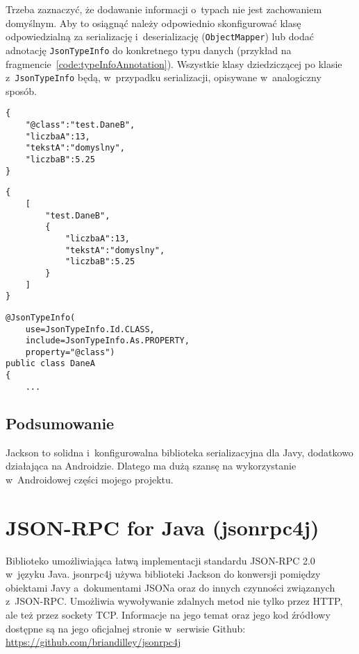 \begin{description}
Trzeba zaznaczyć, że dodawanie informacji o~typach nie jest zachowaniem domyślnym. Aby to osiągnąć należy odpowiednio skonfigurować klasę odpowiedzialną za serializację i~deserializację (\texttt{ObjectMapper}) lub dodać adnotację \texttt{JsonTypeInfo} do konkretnego typu danych (przykład na fragmencie~\ref{code:typeInfoAnnotation}). Wszystkie klasy dziedziczącej po klasie z~\texttt{JsonTypeInfo} będą, w~przypadku serializacji, opisywane w~analogiczny sposób.

\begin{lstlisting}[float, frame=single, caption={Oznaczanie typu przez dodatkowe pole.}, label=code:typeInfoField]
{
    "@class":"test.DaneB",
    "liczbaA":13,
    "tekstA":"domyslny",
    "liczbaB":5.25
}
\end{lstlisting}

\begin{lstlisting}[float, frame=single, caption={Oznaczanie typu przez owinięcie w~tablicę i~dodanie do niej elementu.}, label=code:typeInfoArray]
{
    [
        "test.DaneB",
        {
            "liczbaA":13,
            "tekstA":"domyslny",
            "liczbaB":5.25
        }
    ]
}
\end{lstlisting}

\begin{lstlisting}[float, frame=single, caption={Parametryzacja przekazywania informacji o~typie w~definicji klasy.}, label=code:typeInfoAnnotation]
@JsonTypeInfo(
    use=JsonTypeInfo.Id.CLASS,
    include=JsonTypeInfo.As.PROPERTY,
    property="@class")
public class DaneA
{
    ...
\end{lstlisting}
\end{description}

\subsection{Podsumowanie}
Jackson to solidna i~konfigurowalna biblioteka serializacyjna dla Javy, dodatkowo działająca na Androidzie.
Dlatego ma dużą szansę na wykorzystanie w~Androidowej części mojego projektu.



\section{JSON-RPC for Java (jsonrpc4j)}
Biblioteko umożliwiająca łatwą implementacji standardu JSON-RPC 2.0 w~języku Java.
jsonrpc4j używa biblioteki Jackson do konwersji pomiędzy obiektami Javy a~dokumentami JSONa oraz do innych czynności związanych z~JSON-RPC.
Umożliwia wywoływanie zdalnych metod nie tylko przez HTTP, ale też przez sockety TCP.
Informacje na jego temat oraz jego kod źródłowy dostępne są na jego oficjalnej stronie w~serwisie Github: \url{https://github.com/briandilley/jsonrpc4j}

